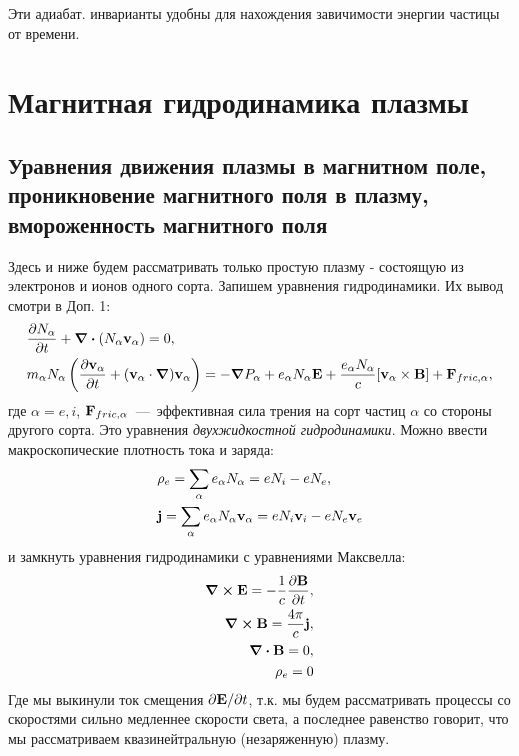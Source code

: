 \documentclass[10pt, a4paper]{article}
\numberwithin{equation}{section}
\begin{document}
Эти адиабат. инварианты удобны для нахождения завичимости энергии частицы от времени.

\section{Магнитная гидродинамика плазмы}

\subsection{Уравнения движения плазмы в магнитном поле, проникновение магнитного поля в плазму, вмороженность магнитного поля}

Здесь и ниже будем рассматривать только простую плазму - состоящую из электронов и ионов одного сорта. Запишем уравнения гидродинамики. Их вывод смотри в Доп. 1:
\begin{align}
	&\pdv{N_\alpha}{t}+\div{ \left( N_\alpha \vb{v}_\alpha \right) } = 0 ,\\
	&m_\alpha N_\alpha \left( \pdv{\vb{v}_\alpha}{t} +(\vb{v}_\alpha \cdot\grad )\vb{v}_\alpha \right) = -\grad{P_\alpha} + e_\alpha N_\alpha\vb{E} + \frac{e_\alpha N_\alpha}{c}[\vb{v}_\alpha \times \vb{B}] + \vb{F}_{fric,\alpha},
\end{align}
где $\alpha = e, i$, $\vb{F}_{fric,\alpha}$~---~эффективная сила трения на сорт частиц $\alpha$ со стороны другого сорта.
Это уравнения \textit{двухжидкостной гидродинамики}.
Можно ввести макроскопические плотность тока и заряда:
\begin{align*}
	&\rho_e = \sum_\alpha e_\alpha N_\alpha = e N_i - e N_e, \\
	&\vb{j} = \sum_\alpha e_\alpha N_\alpha \vb{v}_\alpha = e N_i \vb{v}_i - e N_e \vb{v}_e
\end{align*}
и замкнуть уравнения гидродинамики с уравнениями Максвелла:
\begin{align}
	\curl\vb{E} = -\frac{1}{c}\pdv{\vb{B}}{t}, \\
	\curl\vb{B} = \frac{4\pi}{c}\vb{j}, \\
	\divergence{\vb{B}} = 0,\\
	\rho_e = 0
\end{align}
Где мы выкинули ток смещения $\partial\vb{E}/\partial t$, т.к. мы будем рассматривать процессы со скоростями сильно медленнее скорости света, а последнее равенство говорит, что мы рассматриваем квазинейтральную (незаряженную) плазму.
\end{document}
